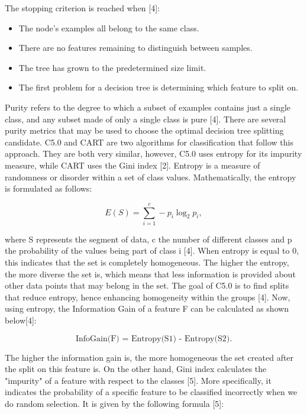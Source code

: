 \documentclass{usiinftr}
\begin{document}
The stopping criterion is reached when [4]:
\begin{itemize}
\item The node's examples all belong to the same class.
\item There are no features remaining to distinguish between samples.
\item The tree has grown to the predetermined size limit. 
\item The first problem for a decision tree is determining which feature to split on.
\end{itemize}

Purity refers to the degree to which a subset of examples contains just a single class, and any subset made of only a single class is pure [4]. There are several purity metrics that may be used to choose the optimal decision tree splitting candidate. C5.0 and CART are two algorithms for classification that follow this approach. They are both very similar, however, C5.0 uses entropy for its impurity measure, while CART uses the Gini index [2]. Entropy is a measure of randomness or disorder within a set of class values. Mathematically, the entropy is formulated as follows: 

\begin{equation}
E(S)=\sum_{i=1}^{c}-p_{i} \log _{2} p_{i},
\end{equation}

where S represents the segment of data, c the number of different classes and p the probability of the values being part of class i [4]. When entropy is equal to 0, this indicates that the set is completely homogeneous. The higher the entropy, the more diverse the set is, which means that less information is provided about other data points that may belong in the set. The goal of C5.0 is to find splits that reduce entropy,  hence enhancing homogeneity within the groups [4]. Now, using entropy, the Information Gain of a feature F can be calculated as shown below[4]:

\begin{equation}
\text{InfoGain(F) = Entropy(S1) - Entropy(S2).}
\end{equation}

The higher the information gain is, the more homogeneous the set created after the split on this feature is. On the other hand, Gini index calculates the "impurity" of a feature with respect to the classes [5]. More specifically, it indicates the probability of a specific feature to be classified incorrectly when we do random selection. It is given by the following formula [5]:
\end{document}
